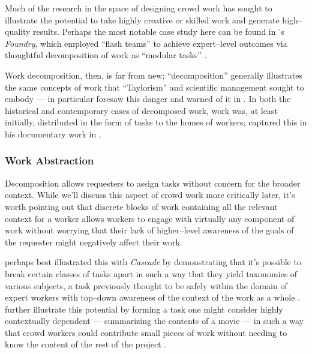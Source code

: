\documentclass[trackingWork]{subfiles}
\begin{document}
{Much of the research in the space of designing crowd work has
sought to illustrate the potential to take highly creative or skilled work
and generate high--quality results.
Perhaps the most notable case study here can be found in
\citeauthor{foundry}'s \textit{Foundry}, which employed
``flash teams'' to achieve expert--level outcomes via thoughtful
decomposition of work as ``modular tasks''
\cite{foundry}.

Work decomposition, then, is far from new;
``decomposition'' generally illustrates the same concepts of work that ``Taylorism''
and scientific management sought to embody
---
\citeauthor{professionalCrowdworkEthics} in particular foresaw this danger and warned of it in
\citeyear{professionalCrowdworkEthics}
\cite{crowdworkFuture,professionalCrowdworkEthics,nickerson2013crowd}.
In both the historical and contemporary cases of decomposed work,
work was,
at least initially,
distributed in the form of tasks to the homes of workers;
\citeauthor{riisOtherSideLives} captured this in his documentary work
in \citeyear{riisOtherSideLives}
\cite{riisOtherSideLives}.

\subsubsection{Work Abstraction}\label{sec:workAbstraction}
Decomposition allows requesters to assign tasks without concern for the broader context.
While we'll discuss this aspect of crowd work more critically later,
it's worth pointing out that discrete blocks of work containing all the relevant context for a worker
allows workers to engage with virtually any component of work without worrying that their lack of 
higher--level awareness of the goals of the requester might negatively affect their work.

\citeauthor{chilton2013cascade} perhaps best illustrated this with
\textit{Cascade} by demonstrating that it's possible to
break certain classes of tasks apart
in such a way that they yield taxonomies of various subjects,
a task previously thought to be safely within the domain of expert workers
with top--down awareness of the context of the work as a whole
\cite{chilton2013cascade}.
\citeauthor{verroios2014context} further illustrate this potential by
forming a task one might consider highly contextually dependent
--- summarizing the contents of a movie ---
in such a way that crowd workers could contribute small pieces of work without
needing to know the content of the rest of the project
\cite{verroios2014context}.

}
\end{document}
